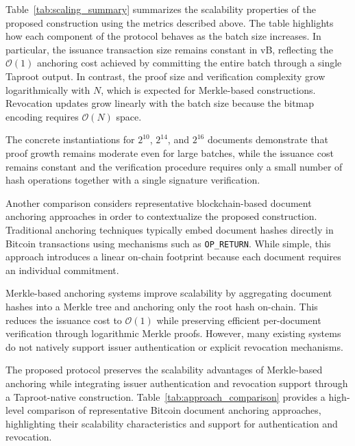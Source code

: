 \documentclass{IEEEoj}
\begin{document}
Table~\ref{tab:scaling_summary} summarizes the scalability properties of the proposed construction using the metrics described above. 
The table highlights how each component of the protocol behaves as the batch size increases. 
In particular, the issuance transaction size remains constant in vB, reflecting the $\mathcal{O}(1)$ anchoring cost achieved by committing the entire batch through a single Taproot output. 
In contrast, the proof size and verification complexity grow logarithmically with $N$, which is expected for Merkle-based constructions. 
Revocation updates grow linearly with the batch size because the bitmap encoding requires $\mathcal{O}(N)$ space.

The concrete instantiations for $2^{10}$, $2^{14}$, and $2^{16}$ documents demonstrate that proof growth remains moderate even for large batches, while the issuance cost remains constant and the verification procedure requires only a small number of hash operations together with a single signature verification.




Another comparison considers representative blockchain-based document anchoring approaches in order to contextualize the proposed construction. 
Traditional anchoring techniques typically embed document hashes directly in Bitcoin transactions using mechanisms such as \texttt{OP\_RETURN}. 
While simple, this approach introduces a linear on-chain footprint because each document requires an individual commitment.

Merkle-based anchoring systems improve scalability by aggregating document hashes into a Merkle tree and anchoring only the root hash on-chain. 
This reduces the issuance cost to $\mathcal{O}(1)$ while preserving efficient per-document verification through logarithmic Merkle proofs. 
However, many existing systems do not natively support issuer authentication or explicit revocation mechanisms.

The proposed protocol preserves the scalability advantages of Merkle-based anchoring while integrating issuer authentication and revocation support through a Taproot-native construction. 
Table~\ref{tab:approach_comparison} provides a high-level comparison of representative Bitcoin document anchoring approaches, highlighting their scalability characteristics and support for authentication and revocation.
\end{document}
